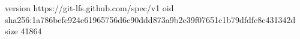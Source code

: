 version https://git-lfs.github.com/spec/v1
oid sha256:1a786befc924e61965756d6c90ddd873a9b2e39f07651c1b79dfdfc8c431342d
size 41864
